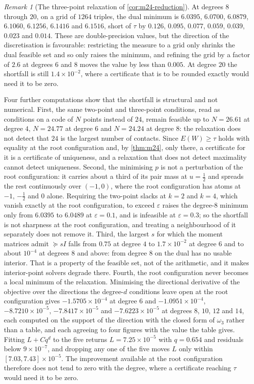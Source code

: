 \documentclass[11pt,reqno]{amsart}
\renewcommand{\_}{\origunderscore\allowbreak}
\numberwithin{equation}{section}
\theoremstyle{plain}
\theoremstyle{definition}
\theoremstyle{remark}
\newtheorem{remark}[thm]{Remark}
\begin{document}
\begin{remark}[The three-point relaxation of \cref{cor:m24-reduction}]
At degrees $8$ through $20$, on a grid of $1264$ triples, the dual
minimum is $6.0395$, $6.0700$, $6.0879$, $6.1060$, $6.1256$, $6.1416$
and $6.1516$, short of $\tau$ by $0.126$, $0.095$, $0.077$, $0.059$,
$0.039$, $0.023$ and $0.014$. These are double-precision values, but the
direction of the discretisation is favourable: restricting the measure
to a grid only shrinks the dual feasible set and so only raises the
minimum, and refining the grid by a factor of $2.6$ at degrees $6$ and
$8$ moves the value by less than $0.005$. At degree $20$ the shortfall
is still $1.4\times10^{-2}$, where a certificate that is to be rounded
exactly would need it to be zero.

Four further computations show that the shortfall is structural and
not numerical. First, the same two-point and three-point conditions,
read as conditions on a code of $N$ points instead of $24$, remain
feasible up to $N=26.61$ at degree $4$, $N=24.77$ at degree $6$ and
$N=24.24$ at degree $8$: the relaxation does not detect that $24$ is the
largest number of contacts. Since $E(W)\ge\tau$ holds with
equality at the root configuration and, by \cref{thm:m24}, only there,
a certificate for it is a certificate of uniqueness, and a relaxation
that does not detect maximality cannot detect uniqueness. Second, the
minimising $p$ is not a perturbation of the root configuration: it
carries about a third of its pair mass at $u=\tfrac12$ and spreads the
rest continuously over $(-1,0)$, where the root configuration has atoms
at $-1$, $-\tfrac12$ and $0$ alone. Requiring the two-point slacks at
$k=2$ and $k=4$, which vanish exactly at the root configuration, to
exceed $\varepsilon$ raises the degree-$8$ minimum only from $6.0395$ to
$6.0489$ at $\varepsilon=0.1$, and is infeasible at $\varepsilon=0.3$;
so the shortfall is not sharpness at the root configuration, and
treating a neighbourhood of it separately does not remove it. Third,
the largest $s$ for which the moment matrices admit $\succeq sI$ falls
from $0.75$ at degree $4$ to $1.7\times10^{-2}$ at degree $6$ and to
about $10^{-4}$ at degrees $8$ and above: from degree $8$ on the dual
has no usable interior. That is a property of the feasible set, not of
the arithmetic, and it makes interior-point solvers degrade
there. Fourth, the root configuration never becomes a local minimum of
the relaxation. Minimising the directional derivative of the objective
over the directions the degree-$d$ conditions leave open at the root
configuration gives $-1.5705\times10^{-4}$ at degree $6$ and
$-1.0951\times10^{-4}$, $-8.7210\times10^{-5}$,
$-7.8417\times10^{-5}$ and $-7.6223\times10^{-5}$ at degrees $8$,
$10$, $12$ and $14$, each computed on the support of the direction with
the closed form of $\omega_3$ rather than a table, and each agreeing to
four figures with the value the table gives. Fitting $L+Cq^d$ to the
five returns $L=7.25\times10^{-5}$ with $q=0.654$ and residuals below
$9\times10^{-7}$, and dropping any one of the five moves $L$ only
within $[7.03,7.43]\times10^{-5}$. The improvement available at the
root configuration therefore does not tend to zero with the degree,
where a certificate reaching $\tau$ would need it to be zero.


\end{remark}
\end{document}

